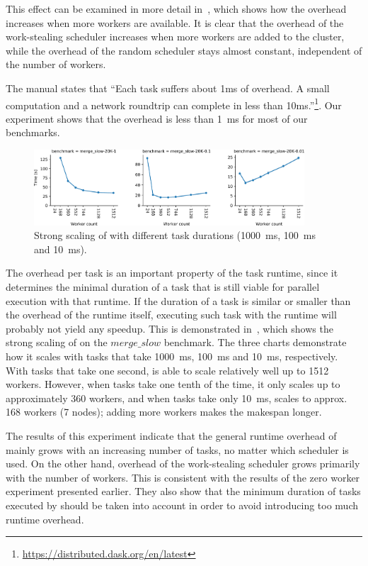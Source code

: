 This effect can be examined in more detail in~, which shows how the
overhead increases when more workers are available. It is clear that the overhead of the
work-stealing scheduler increases when more workers are added to the cluster, while the overhead of
the random scheduler stays almost constant, independent of the number of workers.

The \dask{} manual states that ``Each task suffers about 1ms of overhead. A
small computation and a network roundtrip can complete in less than
10ms.''\footnote{\url{https://distributed.dask.org/en/latest}}. Our experiment shows that the overhead is less than
\SI{1}{\milli\second} for most of our benchmarks.

\begin{figure}
	\centering
	\includegraphics[width=0.9\textwidth]{imgs/rsds/charts/dask-strong-scaling}
	\caption{Strong scaling of \dask{} with different task durations
	(\SI{1000}{\milli\second}, \SI{100}{\milli\second} and \SI{10}{\milli\second}).}
	\label{fig:dask-strong-scaling}
\end{figure}

The overhead per task is an important property of the task runtime, since it determines the minimal
duration of a task that is still viable for parallel execution with that runtime. If the duration
of a task is similar or smaller than the overhead of the runtime itself, executing such task with
the runtime will probably not yield any speedup. This is demonstrated
in~, which shows the strong scaling of \dask{} on
the $merge\_slow$ benchmark. The three charts demonstrate how it scales with tasks
that take \SI{1000}{\milli\second}, \SI{100}{\milli\second} and \SI{10}{\milli\second},
respectively. With tasks that take one second, \dask{} is able to scale
relatively well up to \num{1512} workers. However, when tasks take one tenth of the
time, it only scales up to approximately \num{360} workers, and when tasks take
only \SI{10}{\milli\second}, \dask{} scales to approx.
\num{168} workers (\num{7} nodes); adding more workers makes
the makespan longer.

The results of this experiment indicate that the general runtime overhead of
\dask{} mainly grows with an increasing number of tasks, no matter which
scheduler is used. On the other hand, overhead of the work-stealing scheduler grows primarily with
the number of workers. This is consistent with the results of the zero worker experiment presented
earlier. They also show that the minimum duration of tasks executed by \dask{}
should be taken into account in order to avoid introducing too much runtime overhead.

